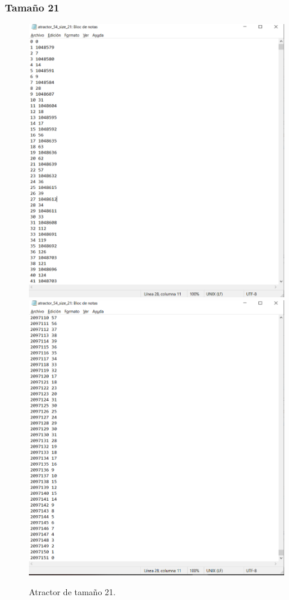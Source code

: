 \documentclass[11pt]{article}
\begin{document}
			\subsubsection{Tamaño 21}
			\begin{figure}[H]
			\centering
			\includegraphics[scale=0.3]{resources/Atractores54/atractor_54_size_21.png}
			\includegraphics[scale=0.3]{resources/Atractores54/atractor_54_size_211.png}
			\caption{Atractor de tamaño 21.}\label{fig:picture}
			\end{figure}
\end{document}
